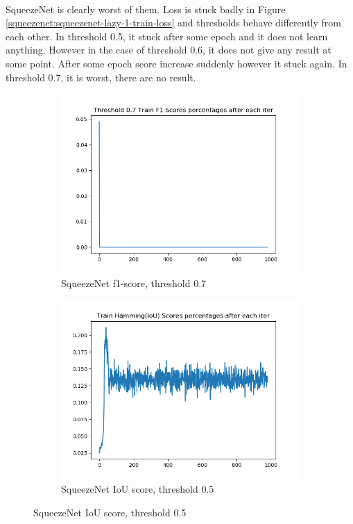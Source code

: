\paragraph{}SqueezeNet is clearly worst of them. Loss is stuck badly in Figure \ref{squeezenet:squeezenet-lazy-1-train-loss} and thresholds behave differently from each other. In threshold 0.5, it stuck after some epoch and it does not learn anything. However in the case of threshold 0.6, it does not give any result at some point. After some epoch score increase suddenly however it stuck again. In threshold 0.7, it is worst, there are no result. 
\begin{figure}[!ht]
\centering
\begin{subfigure}{.5\textwidth}
	\centering
	\includegraphics[width=.9\linewidth]{squeezenet-lazy-1-train-scores-f1-7.png}
	\caption{\label{squeezenet:squeezenet-lazy-1-train-scores-f1-7}SqueezeNet f1-score, threshold 0.7}
\end{subfigure}%
\begin{subfigure}{.5\textwidth}
	\centering
	\includegraphics[width=.9\linewidth]{squeezenet-lazy-1-train-scores-hs.png}
	\caption{\label{squeezenet:squeezenet-lazy-1-train-scores-hs}SqueezeNet IoU score, threshold 0.5}
\end{subfigure}
\end{figure}

